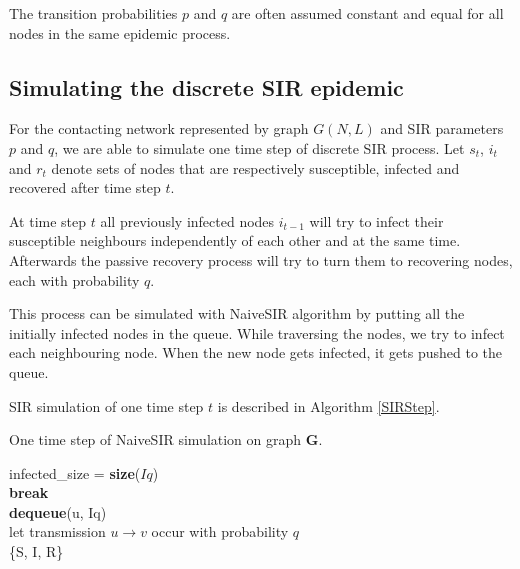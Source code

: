 \documentclass[times, utf8, diplomski]{fer}
\begin{document}
The transition probabilities $p$ and $q$ are often assumed constant and equal for all nodes in the same epidemic process. 

\subsection{Simulating the discrete SIR epidemic}

For the contacting network represented by graph $G(N, L)$ and SIR parameters $p$ and $q$, we are able to simulate one time step of discrete SIR process. Let $s_t$, $i_t$ and $r_t$ denote sets of nodes that are respectively susceptible, infected and recovered after time step $t$. 

At time step $t$ all previously infected nodes $i_{t - 1}$ will try to infect their susceptible neighbours independently of each other and at the same time. Afterwards the passive recovery process will try to turn them to recovering nodes, each with probability $q$.

This process can be simulated with NaiveSIR algorithm  \cite{NaiveSIR} by putting all the initially infected nodes in the queue. While traversing the nodes, we try to infect each neighbouring node. When the new node gets infected, it gets pushed to the queue. 

SIR simulation of one time step $t$ is described in Algorithm \ref{SIRStep}.

\begin{algorithm}[h]
 \caption{One time step of NaiveSIR simulation on graph $\mathbf{G}$.}
 \label{SIRStep}
 infected\_size = \textbf{size}($Iq$)\\
  {
  {
 \textbf{break}\\
 }
 \textbf{dequeue}(u, Iq)\\
  let transmission $u \rightarrow v$ occur with probability  $q$\\
  }
  \Return \{S, I, R\}
\end{algorithm}
\end{document}
